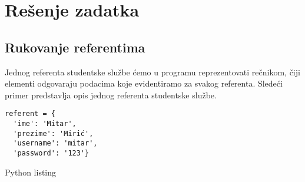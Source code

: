 \documentclass[a4paper]{article}
\begin{document}
\section{Rešenje zadatka}

\subsection{Rukovanje referentima}

Jednog referenta studentske službe ćemo u programu reprezentovati rečnikom, čiji
elementi odgovaraju podacima koje evidentiramo za svakog referenta. Sledeći
primer predstavlja opis jednog referenta studentske službe.

\begin{listing}[htb]
\setlength\partopsep{-\topsep}
\addtolength\partopsep{-\parskip}
\begin{verbatim}
referent = {
  'ime': 'Mitar',
  'prezime': 'Mirić',
  'username': 'mitar',
  'password': '123'}
\end{verbatim}
\caption{Python listing}
\label{lst:java1}
\end{listing}
\end{document}
